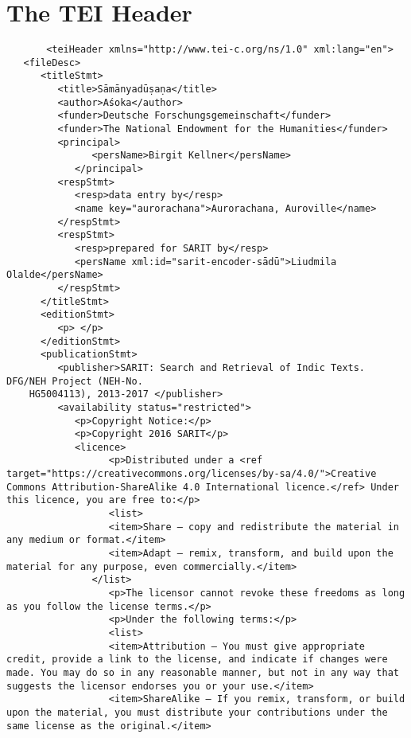 \documentclass[article,12pt,a4paper]{memoir}%
\begin{document}
	      
	    
	    \endnumbering%
	    
     \backmatter 
	 \chapter{The TEI Header}
	 \begin{verbatim}
       <teiHeader xmlns="http://www.tei-c.org/ns/1.0" xml:lang="en">
   <fileDesc>
      <titleStmt>
         <title>Sāmānyadūṣaṇa</title>
         <author>Aśoka</author>
         <funder>Deutsche Forschungsgemeinschaft</funder>
         <funder>The National Endowment for the Humanities</funder>
         <principal>
	           <persName>Birgit Kellner</persName>
	        </principal>
         <respStmt>
            <resp>data entry by</resp>
            <name key="aurorachana">Aurorachana, Auroville</name>
         </respStmt>
         <respStmt>
            <resp>prepared for SARIT by</resp>
            <persName xml:id="sarit-encoder-sādū">Liudmila Olalde</persName>
         </respStmt>
      </titleStmt>
      <editionStmt>
         <p> </p>
      </editionStmt>
      <publicationStmt>
         <publisher>SARIT: Search and Retrieval of Indic Texts. DFG/NEH Project (NEH-No.
	HG5004113), 2013-2017 </publisher>
         <availability status="restricted">
            <p>Copyright Notice:</p>
            <p>Copyright 2016 SARIT</p>
            <licence> 
	              <p>Distributed under a <ref target="https://creativecommons.org/licenses/by-sa/4.0/">Creative Commons Attribution-ShareAlike 4.0 International licence.</ref> Under this licence, you are free to:</p>
	              <list>
                  <item>Share — copy and redistribute the material in any medium or format.</item>
                  <item>Adapt — remix, transform, and build upon the material for any purpose, even commercially.</item>
               </list>
	              <p>The licensor cannot revoke these freedoms as long as you follow the license terms.</p>
	              <p>Under the following terms:</p>
	              <list>
                  <item>Attribution — You must give appropriate credit, provide a link to the license, and indicate if changes were made. You may do so in any reasonable manner, but not in any way that suggests the licensor endorses you or your use.</item>
                  <item>ShareAlike — If you remix, transform, or build upon the material, you must distribute your contributions under the same license as the original.</item>

\end{verbatim}
\end{document}
